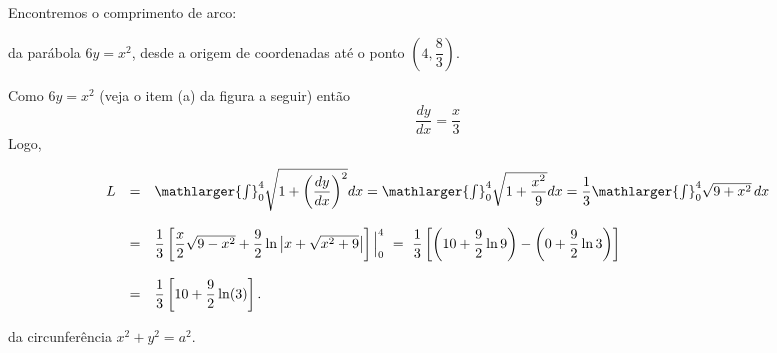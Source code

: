 \cleardoublepage\documentclass[../main.tex]{subfiles}
\begin{document}
\begin{ex}
Encontremos o comprimento de arco:
\begin{compactenum}[a)]
\item da parábola \(6y=x^2\), desde a origem de coordenadas até o ponto \(\left(4,\dfrac{8}{3}\right)\).

\begin{solution}
Como \(6y=x^2\) (veja o item (a) da figura a seguir) então \[\dfrac{dy}{dx}=\dfrac{x}{3}\] Logo,

\[ \begin{array}{rcl} L&=& \mathlarger{\int}^{4}_{0} \sqrt{ 1+ \left(\dfrac{dy}{dx}\right)^2} dx = \mathlarger{\int}^{4}_{0} \sqrt{ 1+ \dfrac{x^2}{9}} dx= \dfrac{1}{3} \mathlarger{\int}^{4}_{0} \sqrt{9+x^2}\, dx\\ \\ &=&\dfrac{1}{3}\left[ \dfrac{x}{2}\sqrt{9-x^2} + \dfrac{9}{2}\ln\left|x+\sqrt{x^2+9} \right| \right]\Big{|}^{4}_{0}\,\,=\,\,\dfrac{1}{3}\left[ \left( 10+\dfrac{9}{2} \ln 9 \right) - \left( 0+\dfrac{9}{2} \ln 3 \right) \right]\\ \\ &=&\dfrac{1}{3} \left[ 10+\dfrac{9}{2} \ln (3) \right]. \end{array} \]
\end{solution}\vspace{-0.5cm}
\begin{figure}[H]
\centering
{}\quad
{}
\end{figure}
\item da circunferência \(x^2+y^2 =a^2\).


\end{compactenum}
\end{ex}
\end{document}
